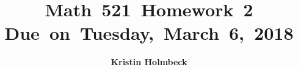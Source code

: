 


\newcommand{\hmwkTitle}{Homework\ 2} %
\newcommand{\hmwkDueDate}{Tuesday,\ March\ 6,\ 2018} %
\newcommand{\hmwkClass}{Math\ 521} %
\newcommand{\hmwkAuthorName}{Kristin Holmbeck} %


\title{
\textmd{\textbf{\hmwkClass \ \hmwkTitle}}\\
\normalsize\vspace{0.1in}\small{Due\ on\ \hmwkDueDate}\\
\vspace{0.1in}
\vspace{0.2in}
}

\author{\textbf{\hmwkAuthorName}}
\date{} %




\maketitle


\vspace{0.75in}
\tableofcontents
\listoffigures
\newpage



